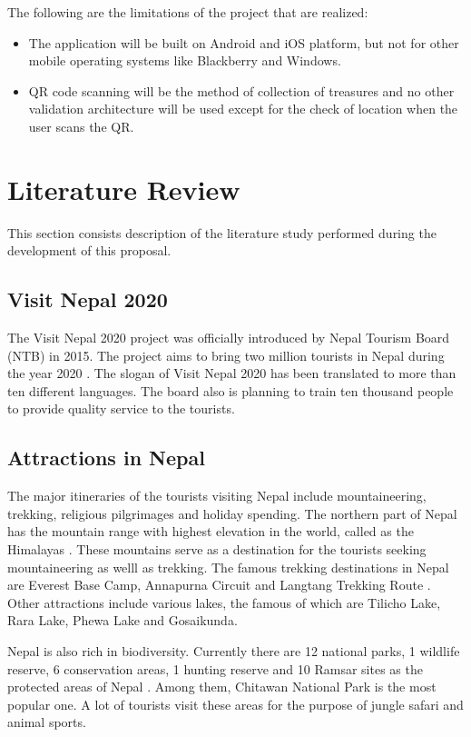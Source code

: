 \documentclass[12pt, a4paper, oneside]{article}
\begin{document}
The following are the limitations of the project that are realized:
\begin{itemize}
 	\item The application will be built on Android and iOS platform, but not for other mobile operating systems like Blackberry and Windows.
	\item QR code scanning will be the method of collection of treasures and no other validation architecture will be used except for the check of location when the user scans the QR.
 \end{itemize}

\break
\section{Literature Review}
This section consists description of the literature study performed during the development of this proposal.

\subsection{Visit Nepal 2020}
The Visit Nepal 2020 project was officially introduced by Nepal Tourism Board (NTB) in 2015. The project aims to bring two million tourists in Nepal during the year 2020 \cite{visitnepal}. The slogan of Visit Nepal 2020 has been translated to more than ten different languages. The board also is planning to train ten thousand people to provide quality service to the tourists. 

\subsection{Attractions in Nepal}
The major itineraries of the tourists visiting Nepal include mountaineering, trekking, religious pilgrimages and holiday spending. The northern part of Nepal has the mountain range with highest elevation in the world, called as the Himalayas \cite{himalayas}. These mountains serve as a destination for the tourists seeking mountaineering as welll as trekking. The famous trekking destinations in Nepal are Everest Base Camp, Annapurna Circuit and Langtang Trekking Route \cite{trekkingroutes}. Other attractions include various lakes, the famous of which are Tilicho Lake, Rara Lake, Phewa Lake and Gosaikunda.

Nepal is also rich in biodiversity. Currently there are 12 national parks, 1 wildlife reserve, 6 conservation areas, 1 hunting reserve and 10 Ramsar sites as the protected areas of Nepal \cite{protectedareas}. Among them, Chitawan National Park is the most popular one. A lot of tourists visit these areas for the purpose of jungle safari and animal sports.
\end{document}
